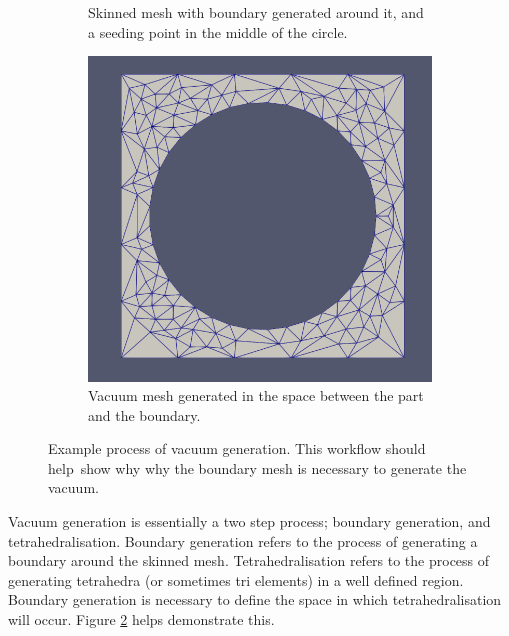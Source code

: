 \documentclass[12pt, letterpaper]{article}
\begin{document}
\begin{figure}[ht]
\begin{subfigure}{0.4\textwidth}
	    \caption{Skinned mesh with boundary generated around it, and a seeding point in the middle of the circle.}
	    \label{SeedingPoint}
	\end{subfigure}
	\hspace*{\fill}	
	\begin{subfigure}{0.4\textwidth}
	    \includegraphics[width=\linewidth]{	processExample/vac.png}
	    \caption{Vacuum mesh generated in the space between the part and the boundary.}
	\end{subfigure}
	\caption{Example process of vacuum generation. This workflow should help\
	show why why the boundary mesh is necessary to generate the vacuum.}
	\label{Boundary Example}
\end{figure}
Vacuum generation is essentially a two step process; boundary generation, and tetrahedralisation. Boundary generation refers to the process of generating a boundary around the skinned mesh. Tetrahedralisation refers to the process of generating tetrahedra (or sometimes tri elements) in a well defined region. Boundary generation is necessary to define the space in which tetrahedralisation will occur. Figure \ref{Boundary Example} helps demonstrate this.
\end{document}
